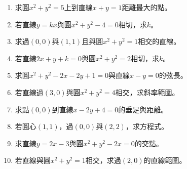 \begin{enumerate}[label=\arabic*.]
    \item 求圓$x^2 + y^2 = 5$上到直線$x + y = 1$距離最大的點。
    \item 若直線$y = kx$與圓$x^2 + y^2 - 4 = 0$相切，求$k$。
    \item 求過$(0, 0)$與$(1, 1)$且與圓$x^2 + y^2 = 1$相交的直線。
    \item 若直線$2x + y + k = 0$與圓$x^2 + y^2 = 2$相切，求$k$。
    \item 求圓$x^2 + y^2 - 2x - 2y + 1 = 0$與直線$x - y = 0$的弦長。
    \item 若直線過$(3, 0)$與圓$x^2 + y^2 = 4$相交，求斜率範圍。
    \item 求點$(0, 0)$到直線$x - 2y + 4 = 0$的垂足與距離。
    \item 若圓心$(1, 1)$，過$(0, 0)$與$(2, 2)$，求方程式。
    \item 求直線$y = 2x - 3$與圓$x^2 + y^2 - 2x = 0$的交點。
    \item 若直線與圓$x^2 + y^2 = 1$相交，求過$(2, 0)$的直線範圍。
\end{enumerate}

